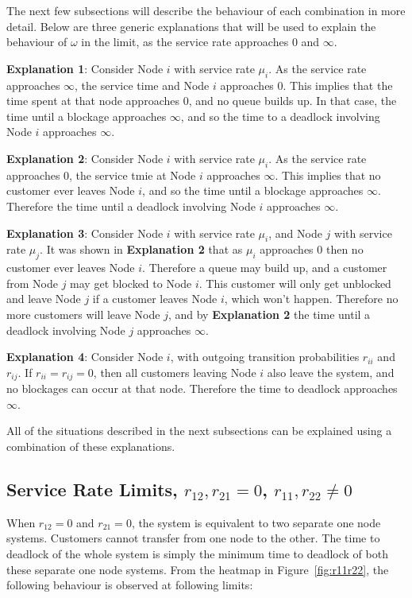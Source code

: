 \documentclass{article}
\begin{document}
The next few subsections will describe the behaviour of each combination in more detail. Below are three generic explanations that will be used to explain the behaviour of $\omega$ in the limit, as the service rate approaches $0$ and $\infty$.

\textbf{Explanation 1}: Consider Node $i$ with service rate $\mu_i$. As the service rate approaches $\infty$, the service time and Node $i$ approaches $0$. This implies that the time spent at that node approaches $0$, and no queue builds up. In that case, the time until a blockage approaches $\infty$, and so the time to a deadlock involving Node $i$ approaches $\infty$.

\textbf{Explanation 2}: Consider Node $i$ with service rate $\mu_i$. As the service rate approaches $0$, the service tmie at Node $i$ approaches $\infty$. This implies that no customer ever leaves Node $i$, and so the time until a blockage approaches $\infty$. Therefore the time until a deadlock involving Node $i$ approaches $\infty$.

\textbf{Explanation 3}: Consider Node $i$ with service rate $\mu_i$, and Node $j$ with service rate $\mu_j$. It was shown in \textbf{Explanation 2} that as $\mu_i$ approaches $0$ then no customer ever leaves Node $i$. Therefore a queue may build up, and a customer from Node $j$ may get blocked to Node $i$. This customer will only get unblocked and leave Node $j$ if a customer leaves Node $i$, which won't happen. Therefore no more customers will leave Node $j$, and by \textbf{Explanation 2} the time until a deadlock involving Node $j$ approaches $\infty$.

\textbf{Explanation 4}: Consider Node $i$, with outgoing transition probabilities $r_{ii}$ and $r_{ij}$. If $r_{ii} = r_{ij} = 0$, then all customers leaving Node $i$ also leave the system, and no blockages can occur at that node. Therefore the time to deadlock approaches $\infty$.

All of the situations described in the next subsections can be explained using a combination of these explanations.


\subsection{Service Rate Limits, $r_{12}, r_{21} = 0$, $r_{11}, r_{22} \neq 0$}\label{sec:r11r22}

When $r_{12} = 0$ and $r_{21} = 0$, the system is equivalent to two separate one node systems. Customers cannot transfer from one node to the other. The time to deadlock of the whole system is simply the minimum time to deadlock of both these separate one node systems. From the heatmap in Figure~\ref{fig:r11r22}, the following behaviour is observed at following limits:
\end{document}
